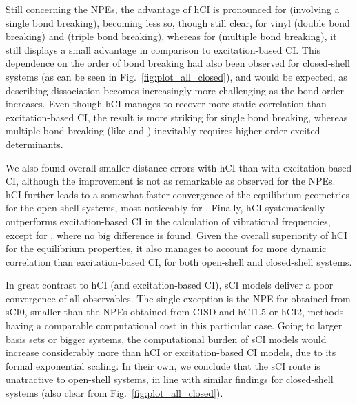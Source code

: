 \documentclass[aip,jcp,reprint,noshowkeys,superscriptaddress]{revtex4-1}
\begin{document}
Still concerning the NPEs, the advantage of hCI is pronounced for  (involving a single bond breaking), 
becoming less so, though still clear, for vinyl (double bond breaking) and  (triple bond breaking),
whereas for  (multiple bond breaking), it still displays a small advantage in comparison to excitation-based CI.
This dependence on the order of bond breaking had also been observed for closed-shell systems \cite{Kossoski_2022} (as can be seen in Fig.~\ref{fig:plot_all_closed}),
and would be expected, as describing dissociation becomes increasingly more challenging as the bond order increases.
Even though hCI manages to recover more static correlation than excitation-based CI,
the result is more striking for single bond breaking, whereas multiple bond breaking (like  and ) inevitably requires higher order excited determinants.
 
We also found overall smaller distance errors with hCI than with excitation-based CI, although the improvement is not as remarkable as observed for the NPEs.
hCI further leads to a somewhat faster convergence of the equilibrium geometries for the open-shell systems, most noticeably for .
Finally, hCI systematically outperforms excitation-based CI in the calculation of vibrational frequencies, except for , where no big difference is found.
Given the overall superiority of hCI for the equilibrium properties, it also manages to account for more dynamic correlation than excitation-based CI,
for both open-shell and closed-shell systems.

In great contrast to hCI (and excitation-based CI),
sCI models deliver a poor convergence of all observables.
The single exception is the NPE for  obtained from sCI0, smaller than the NPEs obtained from CISD and hCI1.5 or hCI2, methods having a comparable computational cost in this particular case.
Going to larger basis sets or bigger systems, the computational burden of sCI models would increase considerably more than hCI or excitation-based CI models, 
due to its formal exponential scaling.
In their own, we conclude that the sCI route is unatractive to open-shell systems,
in line with similar findings for closed-shell systems \cite{Kossoski_2022} (also clear from Fig.~\ref{fig:plot_all_closed}).


\end{document}
